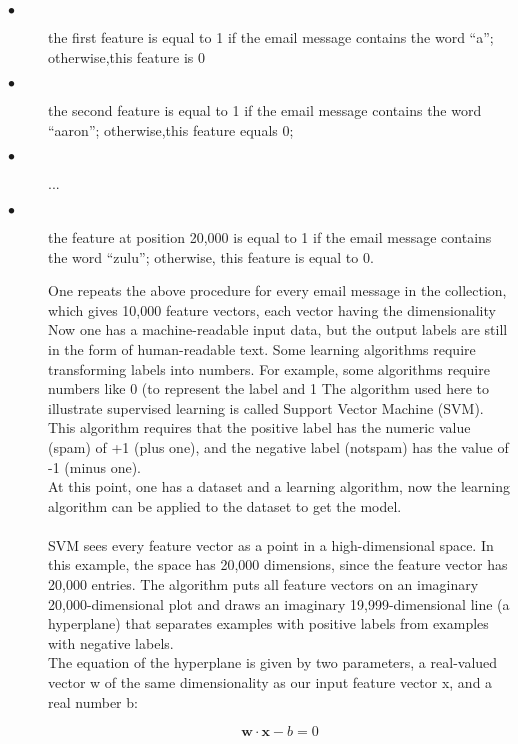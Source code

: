 \begin{description}
  \item[$\bullet$] the first feature is equal to 1 if the email message contains the word “a”; otherwise,this feature is 0
  \item[$\bullet$] the second feature is equal to 1 if the email message contains the word “aaron”; otherwise,this feature equals 0;
  \item[$\bullet$] ...
  \item[$\bullet$] the feature at position 20,000 is equal to 1 if the email message contains the word “zulu”; otherwise, this feature is equal to 0.
 
One repeats the above procedure for every email message in the collection, which gives 10,000 feature vectors, each vector having the dimensionality %
\\

Now one has a machine-readable input data, but the output labels are still in the form of human-readable text. Some learning algorithms require transforming labels into numbers. For example, some algorithms require numbers like 0 (to represent the label %
and 1 %
The algorithm used here to illustrate supervised learning is called Support Vector Machine (SVM). This algorithm requires that the positive label has the numeric value (spam) of  +1 (plus one), and the negative label (notspam) has the value of -1 (minus one). \\
At this point, one has a dataset and a learning algorithm, now the learning algorithm can be applied to the dataset to get the model. \\
\\
SVM sees every feature vector as a point in a high-dimensional space. In this example, the space has 20,000 dimensions, since the feature vector has 20,000 entries. The algorithm puts all feature vectors on an imaginary 20,000-dimensional plot and draws an imaginary 19,999-dimensional line (a hyperplane) that separates examples with positive labels from examples with negative labels.\\
The equation of the hyperplane is given by two parameters, a real-valued vector w of the same dimensionality as our input feature vector x, and a real number b:

\begin{equation}
	\textbf{w} \cdot \textbf{x} - b = 0
\end{equation}


\end{description}
